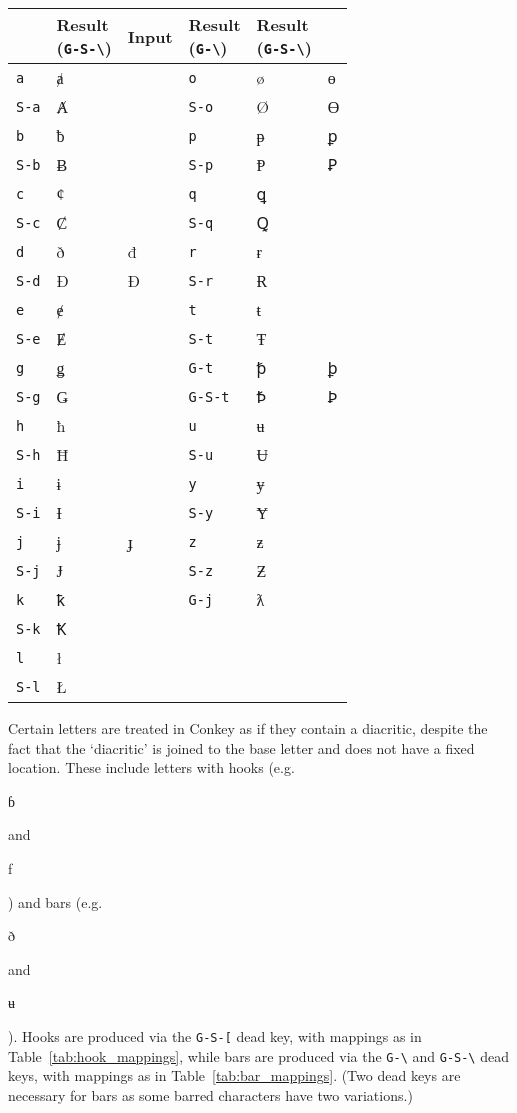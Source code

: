 \documentclass[oneside]{memoir}
\newcommand{\key}{\verb}
\newcommand{\keynv}{\texttt}
\newcommand{\out}[1]{\colorbox{gray!20}{\strut{}#1}}
\begin{document}
\begin{table}
\begin{minipage}{0.55\paperwidth}
\begin{tabular}{lll@{\hspace{1cm}}lll}
 & \makecell{Result\\(\keynv{G-S-\textbackslash})}
& Input
 & \makecell{Result\\(\keynv{G-\textbackslash})}
 & \makecell{Result\\(\keynv{G-S-\textbackslash})} \\
\midrule
\key|a|   & ⱥ &   & \key|o|     & ø & ɵ \\
\key|S-a| & Ⱥ &   & \key|S-o|   & Ø & Ɵ \\
\key|b|   & ƀ &   & \key|p|     & ᵽ & ꝑ \\
\key|S-b| & Ƀ &   & \key|S-p|   & Ᵽ & Ꝑ \\
\key|c|   & ȼ &   & \key|q|     & ꝗ &   \\
\key|S-c| & Ȼ &   & \key|S-q|   & Ꝗ &   \\
\key|d|   & ð & đ & \key|r|     & ɍ &   \\
\key|S-d| & Ð & Đ & \key|S-r|   & Ɍ &   \\
\key|e|   & ɇ &   & \key|t|     & ŧ &   \\
\key|S-e| & Ɇ &   & \key|S-t|   & Ŧ &   \\
\key|g|   & ǥ &   & \key|G-t|   & ꝥ & ꝧ \\
\key|S-g| & Ǥ &   & \key|G-S-t| & Ꝥ & Ꝧ \\
\key|h|   & ħ &   & \key|u|     & ʉ & \\
\key|S-h| & Ħ &   & \key|S-u|   & Ʉ & \\
\key|i|   & ɨ &   & \key|y|     & ɏ & \\
\key|S-i| & Ɨ &   & \key|S-y|   & Ɏ & \\
\key|j|   & ɉ & ɟ & \key|z|     & ƶ & \\
\key|S-j| & Ɉ &   & \key|S-z|   & Ƶ & \\
\key|k|   & ꝁ &   & \key|G-j|   & ƛ & \\
\key|S-k| & Ꝁ &   &             &   & \\
\key|l|   & ł &   &             &   & \\
\key|S-l| & Ł &   &             &   & \\
\bottomrule
\end{tabular}
\end{minipage}
\end{table}

Certain letters are treated in Conkey as if they contain a diacritic,
  despite the fact that the `diacritic' is joined to the base letter and does not have a fixed location.
These include letters with hooks (e.g.\ \out{ɓ} and \out{ƒ}) and bars (e.g.\ \out{ð} and \out{ʉ}).
Hooks are produced via the \key|G-S-[| dead key, with mappings as in Table~\ref{tab:hook_mappings},
  while bars are produced via the \key|G-\| and \key|G-S-\| dead keys, with mappings as in Table~\ref{tab:bar_mappings}.
(Two dead keys are necessary for bars as some barred characters have two variations.)
\end{document}
